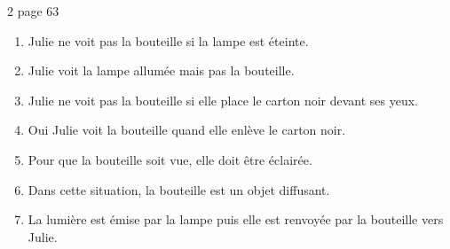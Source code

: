 \begin{myact}{2 page 63}
	\begin{enumerate}
		\item Julie ne voit pas la bouteille si la lampe est éteinte.\pause
		\item Julie voit la lampe allumée mais pas la bouteille.\pause
		\item Julie ne voit pas la bouteille si elle place le carton noir devant ses yeux.\pause
		\item Oui Julie voit la bouteille quand elle enlève le carton noir.\pause
		\item Pour que la bouteille soit vue, elle doit être éclairée.\pause
		\item Dans cette situation, la bouteille est un objet diffusant.\pause
		\item La lumière est émise par la lampe puis elle est renvoyée par la bouteille vers Julie.
	\end{enumerate}
\end{myact}